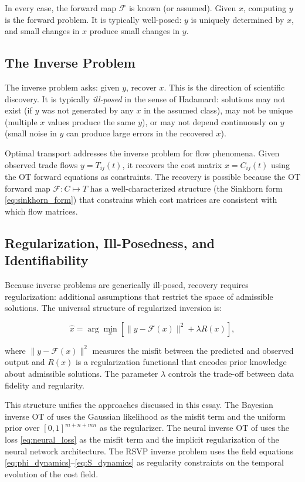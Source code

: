 \documentclass[12pt]{article}
\begin{document}
In every case, the forward map $\mathcal{F}$ is known (or assumed). Given $x$, computing $y$ is the forward problem. It is typically well-posed: $y$ is uniquely determined by $x$, and small changes in $x$ produce small changes in $y$.

\subsection{The Inverse Problem}

The inverse problem asks: given $y$, recover $x$. This is the direction of scientific discovery. It is typically \emph{ill-posed} in the sense of Hadamard: solutions may not exist (if $y$ was not generated by any $x$ in the assumed class), may not be unique (multiple $x$ values produce the same $y$), or may not depend continuously on $y$ (small noise in $y$ can produce large errors in the recovered $x$).

Optimal transport addresses the inverse problem for flow phenomena. Given observed trade flows $y = T_{ij}(t)$, it recovers the cost matrix $x = C_{ij}(t)$ using the OT forward equations as constraints. The recovery is possible because the OT forward map $\mathcal{F}: C \mapsto T$ has a well-characterized structure (the Sinkhorn form \eqref{eq:sinkhorn_form}) that constrains which cost matrices are consistent with which flow matrices.

\subsection{Regularization, Ill-Posedness, and Identifiability}

Because inverse problems are generically ill-posed, recovery requires regularization: additional assumptions that restrict the space of admissible solutions. The universal structure of regularized inversion is:

\begin{equation}
\hat{x} = \arg\min_{x} \left[\|y - \mathcal{F}(x)\|^2 + \lambda R(x)\right],
\label{eq:regularized_inverse}
\end{equation}

where $\|y - \mathcal{F}(x)\|^2$ measures the misfit between the predicted and observed output and $R(x)$ is a regularization functional that encodes prior knowledge about admissible solutions. The parameter $\lambda$ controls the trade-off between data fidelity and regularity.

This structure unifies the approaches discussed in this essay. The Bayesian inverse OT of \citet{stuart2019} uses the Gaussian likelihood as the misfit term and the uniform prior over $[0,1]^{m+n+mn}$ as the regularizer. The neural inverse OT of \citet{gaskin2026} uses the loss \eqref{eq:neural_loss} as the misfit term and the implicit regularization of the neural network architecture. The RSVP inverse problem uses the field equations \eqref{eq:phi_dynamics}--\eqref{eq:S_dynamics} as regularity constraints on the temporal evolution of the cost field.
\end{document}
